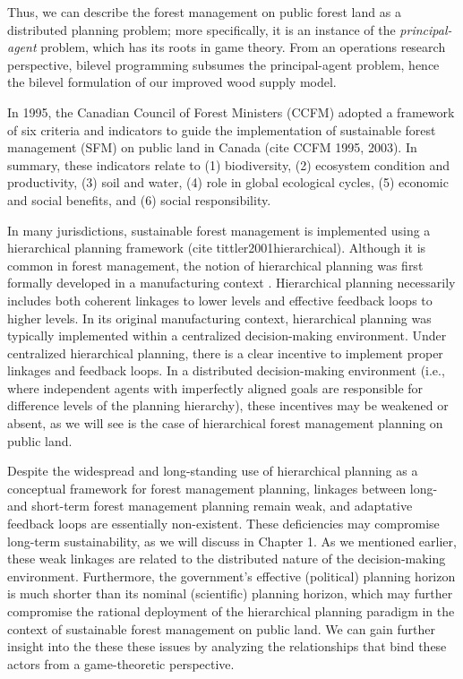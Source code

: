 Thus, we can describe the forest management on public forest land as a distributed planning problem; more specifically, it is an instance of the \emph{principal-agent} problem, which has its roots in game theory. From an operations research perspective, bilevel programming subsumes the principal-agent problem, hence the bilevel formulation of our improved wood supply model. 

In 1995, the Canadian Council of Forest Ministers (CCFM) adopted a framework of six criteria and indicators to guide the implementation of sustainable forest management (SFM) on public land in Canada (cite CCFM 1995, 2003). In summary, these indicators relate to (1) biodiversity, (2) ecosystem condition and productivity, (3) soil and water, (4) role in global ecological cycles, (5) economic and social benefits, and (6) social responsibility.

In many jurisdictions, sustainable forest management is implemented using a hierarchical planning framework (cite  tittler2001hierarchical). Although it is common in forest management, the notion of hierarchical planning was first formally developed in a manufacturing context \citep{hax1977design}. Hierarchical planning necessarily includes both coherent linkages to lower levels and effective feedback loops to higher levels. In its original manufacturing context, hierarchical planning was typically implemented within a centralized decision-making environment. Under centralized hierarchical planning, there is a clear incentive to implement proper linkages and feedback loops. In a distributed decision-making environment (i.e., where independent agents with imperfectly aligned goals are responsible for difference levels of the planning hierarchy), these incentives may be weakened or absent, as we will see is the case of hierarchical forest management planning on public land. 

Despite the widespread and long-standing use of hierarchical planning as a conceptual framework for forest management planning, linkages between long- and short-term forest management planning remain weak, and adaptative feedback loops are essentially non-existent. These deficiencies may compromise long-term sustainability, as we will discuss in Chapter 1. As we mentioned earlier, these weak linkages are related to the distributed nature of the decision-making environment. Furthermore, the government's effective (political) planning horizon is much shorter than its nominal (scientific) planning horizon, which may further compromise the rational deployment of the hierarchical planning paradigm in the context of sustainable forest management on public land. We can gain further insight into the these these issues by analyzing the relationships that bind these actors from a game-theoretic perspective. 

